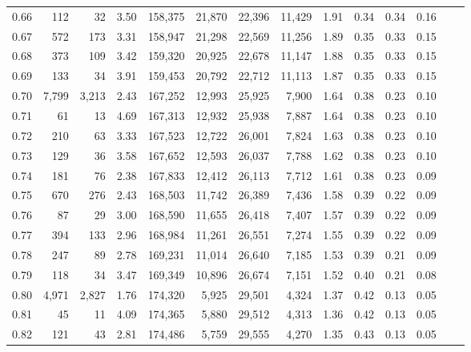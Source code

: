 \begin{tabular}{rrrrrrrrrrrrrr}
0.66 &     112 &     32 &    3.50 &  158,375 &   21,870 &  22,396 &  11,429 &  1.91 &  0.34 &  0.34 &      0.16 \\
0.67 &     572 &    173 &    3.31 &  158,947 &   21,298 &  22,569 &  11,256 &  1.89 &  0.35 &  0.33 &      0.15 \\
0.68 &     373 &    109 &    3.42 &  159,320 &   20,925 &  22,678 &  11,147 &  1.88 &  0.35 &  0.33 &      0.15 \\
0.69 &     133 &     34 &    3.91 &  159,453 &   20,792 &  22,712 &  11,113 &  1.87 &  0.35 &  0.33 &      0.15 \\
0.70 &   7,799 &  3,213 &    2.43 &  167,252 &   12,993 &  25,925 &   7,900 &  1.64 &  0.38 &  0.23 &      0.10 \\
0.71 &      61 &     13 &    4.69 &  167,313 &   12,932 &  25,938 &   7,887 &  1.64 &  0.38 &  0.23 &      0.10 \\
0.72 &     210 &     63 &    3.33 &  167,523 &   12,722 &  26,001 &   7,824 &  1.63 &  0.38 &  0.23 &      0.10 \\
0.73 &     129 &     36 &    3.58 &  167,652 &   12,593 &  26,037 &   7,788 &  1.62 &  0.38 &  0.23 &      0.10 \\
0.74 &     181 &     76 &    2.38 &  167,833 &   12,412 &  26,113 &   7,712 &  1.61 &  0.38 &  0.23 &      0.09 \\
0.75 &     670 &    276 &    2.43 &  168,503 &   11,742 &  26,389 &   7,436 &  1.58 &  0.39 &  0.22 &      0.09 \\
0.76 &      87 &     29 &    3.00 &  168,590 &   11,655 &  26,418 &   7,407 &  1.57 &  0.39 &  0.22 &      0.09 \\
0.77 &     394 &    133 &    2.96 &  168,984 &   11,261 &  26,551 &   7,274 &  1.55 &  0.39 &  0.22 &      0.09 \\
0.78 &     247 &     89 &    2.78 &  169,231 &   11,014 &  26,640 &   7,185 &  1.53 &  0.39 &  0.21 &      0.09 \\
0.79 &     118 &     34 &    3.47 &  169,349 &   10,896 &  26,674 &   7,151 &  1.52 &  0.40 &  0.21 &      0.08 \\
0.80 &   4,971 &  2,827 &    1.76 &  174,320 &    5,925 &  29,501 &   4,324 &  1.37 &  0.42 &  0.13 &      0.05 \\
0.81 &      45 &     11 &    4.09 &  174,365 &    5,880 &  29,512 &   4,313 &  1.36 &  0.42 &  0.13 &      0.05 \\
0.82 &     121 &     43 &    2.81 &  174,486 &    5,759 &  29,555 &   4,270 &  1.35 &  0.43 &  0.13 &      0.05 \\

\end{tabular}
